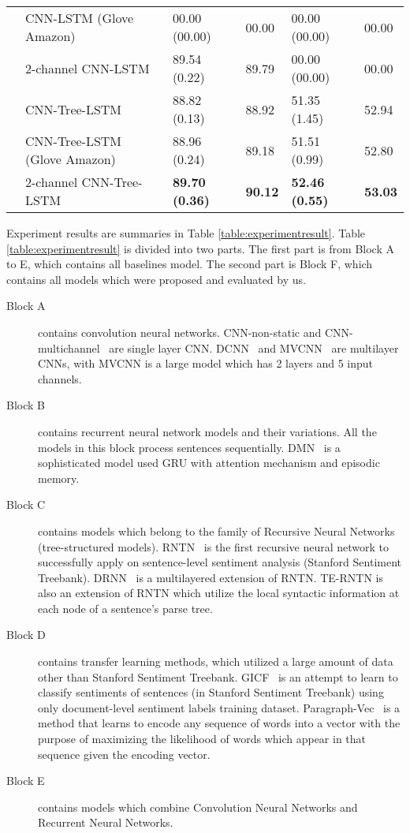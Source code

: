\begin{table*}[]
\begin{tabular}{|c|l|ll|ll|}
		  & CNN-LSTM (Glove Amazon) & 00.00 (00.00) & 00.00  & 00.00 (00.00) & 00.00 \\
		& 2-channel CNN-LSTM                        & 89.54    (0.22) & 89.79 & 00.00 (00.00) & 00.00 \\
		 & CNN-Tree-LSTM                            & 88.82 (0.13) & 88.92 & 51.35 (1.45) & 52.94 \\
		& CNN-Tree-LSTM (Glove Amazon)             & 88.96 (0.24) & 89.18 & 51.51 (0.99) & 52.80 \\
		& 2-channel CNN-Tree-LSTM  &\textbf{89.70 (0.36)} & \textbf{90.12}  & \textbf{52.46 (0.55)} & \textbf{53.03} \Bstrut  \\
		\hline
	\end{tabular}
\end{table*}
Experiment results are summaries in Table \ref{table:experimentresult}.
Table \ref{table:experimentresult} is divided into two parts.
The first part is from Block A to E, which contains all baselines model.
The second part is Block F, which contains all models which were proposed and evaluated by us.
\begin{description}
	\item[Block A] contains convolution neural networks.
	CNN-non-static and CNN-multichannel~\cite{KimCNN} are single layer CNN.
	DCNN~\cite{DCNN} and MVCNN~\cite{2-layer-cnn} are multilayer CNNs, with MVCNN is a large model  which has 2 layers and 5 input channels.
	\item[Block B] contains recurrent neural network models and their variations.
	All the models in this block process sentences sequentially.
	DMN~\cite{attention-gru} is a sophisticated model used GRU with attention mechanism and episodic memory.
	\item[Block C] contains models which belong to the family of Recursive Neural Networks (tree-structured models).
	RNTN~\cite{socher2013recursive} is the first recursive neural network to successfully apply on sentence-level sentiment analysis (Stanford Sentiment Treebank).
	DRNN~\cite{IrsoyDRNN} is a multilayered extension of RNTN.
	TE-RNTN is also an extension of RNTN which utilize the local syntactic information at each node of a sentence's parse tree.
	\item[Block D] contains transfer learning methods, which utilized a large amount of data other than Stanford Sentiment Treebank.
	GICF~\cite{group-instance} is an attempt to learn to classify sentiments of sentences (in Stanford Sentiment Treebank) using only document-level sentiment labels training dataset.
	Paragraph-Vec~\cite{ParagraphVec} is a method that learns to encode any sequence of words into a vector with the purpose of maximizing the likelihood of words which appear in that sequence given the encoding vector.
	\item[Block E] contains models which combine Convolution Neural Networks and Recurrent Neural Networks.
\end{description}
